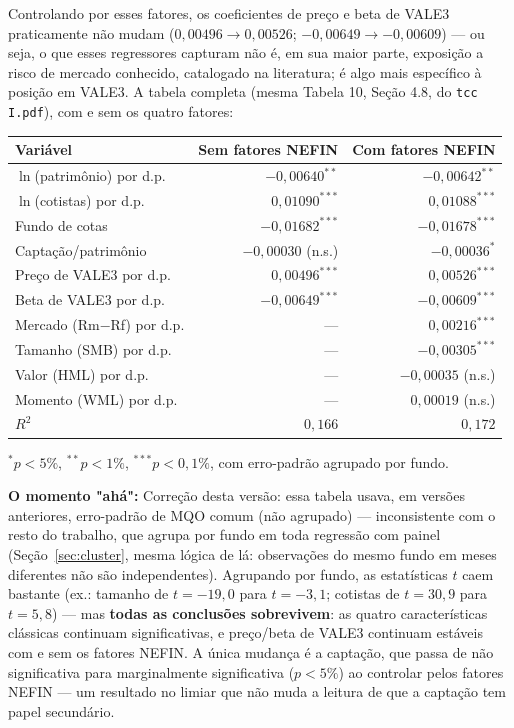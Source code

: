 \documentclass[11pt,a4paper]{article}
\newcommand{\aha}[1]{\par\vspace{4pt}\noindent\textbf{\color{vermelho}O momento "ahá":} #1\par\vspace{2pt}}
\begin{document}
Controlando por esses fatores, os coeficientes de preço e beta de VALE3 praticamente não mudam
($0{,}00496 \to 0{,}00526$; $-0{,}00649 \to -0{,}00609$) --- ou seja, o que esses regressores
capturam não é, em sua maior parte, exposição a risco de mercado conhecido, catalogado na
literatura; é algo mais específico à posição em VALE3. A tabela completa (mesma Tabela 10, Seção
4.8, do \texttt{tcc I.pdf}), com e sem os quatro fatores:

\begin{center}\small
\begin{tabular}{@{}lrr@{}}
\toprule
Variável & Sem fatores NEFIN & Com fatores NEFIN \\
\midrule
$\ln$(patrimônio) por d.p. & $-0{,}00640^{**}$ & $-0{,}00642^{**}$ \\
$\ln$(cotistas) por d.p.   & $0{,}01090^{***}$  & $0{,}01088^{***}$ \\
Fundo de cotas              & $-0{,}01682^{***}$ & $-0{,}01678^{***}$ \\
Captação/patrimônio        & $-0{,}00030$ (n.s.) & $-0{,}00036^{*}$ \\
Preço de VALE3 por d.p.    & $0{,}00496^{***}$  & $0{,}00526^{***}$ \\
Beta de VALE3 por d.p.     & $-0{,}00649^{***}$ & $-0{,}00609^{***}$ \\
Mercado (Rm$-$Rf) por d.p. & --- & $0{,}00216^{***}$ \\
Tamanho (SMB) por d.p.     & --- & $-0{,}00305^{***}$ \\
Valor (HML) por d.p.       & --- & $-0{,}00035$ (n.s.) \\
Momento (WML) por d.p.     & --- & $0{,}00019$ (n.s.) \\
\midrule
$R^2$ & $0{,}166$ & $0{,}172$ \\
\bottomrule
\end{tabular}
\end{center}
{\footnotesize $^{*}p<5\%$, $^{**}p<1\%$, $^{***}p<0{,}1\%$, com erro-padrão agrupado por fundo.}

\aha{Correção desta versão: essa tabela usava, em versões anteriores, erro-padrão de MQO comum
(não agrupado) --- inconsistente com o resto do trabalho, que agrupa por fundo em toda regressão
com painel (Seção~\ref{sec:cluster}, mesma lógica de lá: observações do mesmo fundo em meses
diferentes não são independentes). Agrupando por fundo, as estatísticas $t$ caem bastante (ex.:
tamanho de $t=-19{,}0$ para $t=-3{,}1$; cotistas de $t=30{,}9$ para $t=5{,}8$) --- mas
\textbf{todas as conclusões sobrevivem}: as quatro características clássicas continuam
significativas, e preço/beta de VALE3 continuam estáveis com e sem os fatores NEFIN. A única
mudança é a captação, que passa de não significativa para marginalmente significativa
($p<5\%$) ao controlar pelos fatores NEFIN --- um resultado no limiar que não muda a leitura de
que a captação tem papel secundário.}
\end{document}
